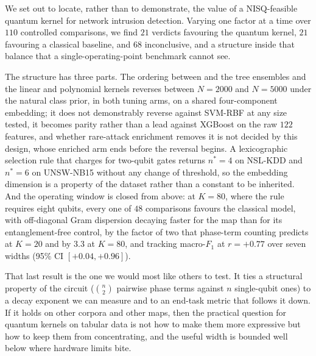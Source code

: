 %

\begin{revbody}
We set out to locate, rather than to demonstrate, the value of a NISQ-feasible
quantum kernel for network intrusion detection. Varying one factor at a time
over $110$ controlled comparisons, we find $21$ verdicts favouring the quantum
kernel, $21$ favouring a classical baseline, and $68$ inconclusive, and a
structure inside that balance that a single-operating-point benchmark cannot
see.

The structure has three parts. The ordering between \QSVM{} and the tree
ensembles and the linear and polynomial kernels reverses between $N=2000$ and
$N=5000$ under the natural class prior, in both tuning arms, on a shared
four-component embedding; it does not demonstrably reverse against SVM-RBF at
any size tested, it becomes parity rather than a lead against XGBoost on the raw
$122$ features, and whether rare-attack enrichment removes it is not decided by
this design, whose enriched arm ends before the reversal begins. A
lexicographic selection rule that charges for two-qubit gates returns
$n^{\ast}=4$ on NSL-KDD and $n^{\ast}=6$ on UNSW-NB15 without any change of
threshold, so the embedding dimension is a property of the dataset rather than a
constant to be inherited. And the operating window is closed from above: at
$K=80$, where the rule requires eight qubits, every one of $48$ comparisons
favours the classical model, with off-diagonal Gram dispersion decaying faster
for the \ZZ{} map than for its entanglement-free control, by the factor of two
that phase-term counting predicts at $K=20$ and by $3.3$ at $K=80$, and tracking
macro-$F_1$ at $r=+0.77$ over seven widths (95\% CI $[+0.04,+0.96]$).

That last result is the one we would most like others to test. It ties a
structural property of the circuit ($\binom{n}{2}$ pairwise phase terms
against $n$ single-qubit ones) to a decay exponent we can measure and to an
end-task metric that follows it down. If it holds on other corpora and other
maps, then the practical question for quantum kernels on tabular data is not how
to make them more expressive but how to keep them from concentrating, and the
useful width is bounded well below where hardware limits bite.


\end{revbody}
